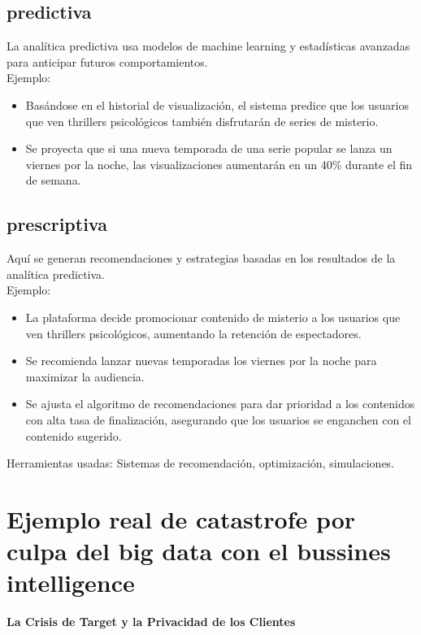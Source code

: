 \documentclass[12pt]{article}
\begin{document}
\subsection{predictiva}

La analítica predictiva usa modelos de machine learning y estadísticas avanzadas para anticipar futuros comportamientos.
\\
Ejemplo:

\begin{itemize}
    \item Basándose en el historial de visualización, el sistema predice que los usuarios que ven thrillers psicológicos 
    también disfrutarán de series de misterio.
    \item Se proyecta que si una nueva temporada de una serie popular se lanza un viernes por la noche, 
    las visualizaciones aumentarán en un 40\% durante el fin de semana.
\end{itemize}

\subsection{prescriptiva}

Aquí se generan recomendaciones y estrategias basadas en los resultados de la analítica predictiva.
\\
Ejemplo:
\begin{itemize}
    \item La plataforma decide promocionar contenido de misterio a los usuarios que ven thrillers psicológicos, 
    aumentando la retención de espectadores.
    \item Se recomienda lanzar nuevas temporadas los viernes por la noche para maximizar la audiencia.
    \item Se ajusta el algoritmo de recomendaciones para dar prioridad a los contenidos con alta tasa de finalización, 
    asegurando que los usuarios se enganchen con el contenido sugerido.
\end{itemize}

Herramientas usadas: Sistemas de recomendación, optimización, simulaciones.

\section{Ejemplo real de catastrofe por culpa del big data con el bussines intelligence}

\textbf{La Crisis de Target y la Privacidad de los Clientes}
\end{document}

